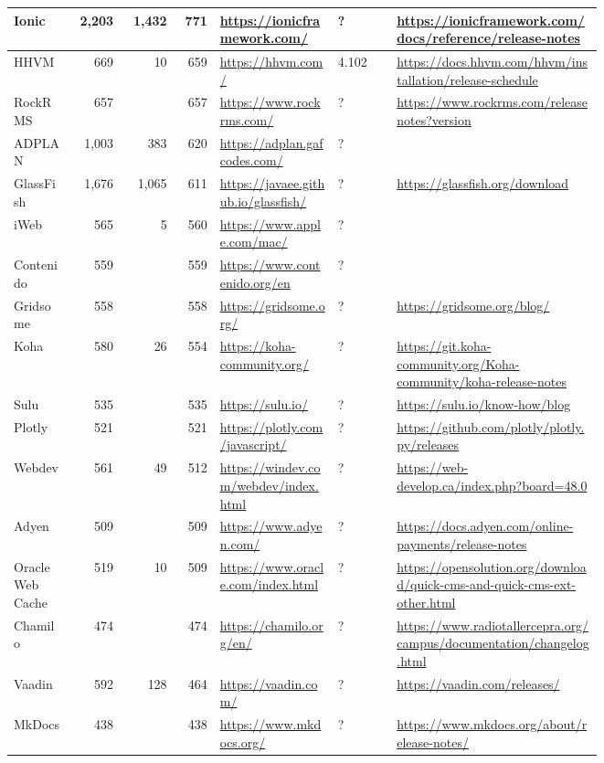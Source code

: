 \begin{landscape}
\begin{longtable}{|p{0.1\linewidth}|r|r|r|p{0.2\linewidth}|p{0.1\linewidth}|p{0.35\linewidth}|}
		Ionic &2,203 &1,432 &771 &\url{https://ionicframework.com/} &? &\url{https://ionicframework.com/docs/reference/release-notes} \\\hline
		HHVM &669 &10 &659 &\url{https://hhvm.com/} &4.102 &\url{https://docs.hhvm.com/hhvm/installation/release-schedule} \\\hline
		RockRMS &657 & &657 &\url{https://www.rockrms.com/} &? &\url{https://www.rockrms.com/releasenotes?version} \\\hline
		ADPLAN &1,003 &383 &620 &\url{https://adplan.gafcodes.com/} &? & \\\hline
		GlassFish &1,676 &1,065 &611 &\url{https://javaee.github.io/glassfish/} &? &\url{https://glassfish.org/download} \\\hline
		iWeb &565 &5 &560 &\url{https://www.apple.com/mac/} &? & \\\hline
		Contenido &559 & &559 &\url{https://www.contenido.org/en} &? & \\\hline
		Gridsome &558 & &558 &\url{https://gridsome.org/} &? &\url{https://gridsome.org/blog/} \\\hline
		Koha &580 &26 &554 &\url{https://koha-community.org/} &? &\url{https://git.koha-community.org/Koha-community/koha-release-notes} \\\hline
		Sulu &535 & &535 &\url{https://sulu.io/} &? &\url{https://sulu.io/know-how/blog} \\\hline
		Plotly &521 & &521 &\url{https://plotly.com/javascript/} &? &\url{https://github.com/plotly/plotly.py/releases} \\\hline
		Webdev &561 &49 &512 &\url{https://windev.com/webdev/index.html} &? &\url{https://web-develop.ca/index.php?board=48.0} \\\hline
		Adyen &509 & &509 &\url{https://www.adyen.com/} &? &\url{https://docs.adyen.com/online-payments/release-notes} \\\hline
		Oracle Web Cache &519 &10 &509 &\url{https://www.oracle.com/index.html} &? &\url{https://opensolution.org/download/quick-cms-and-quick-cms-ext-other.html} \\\hline
		Chamilo &474 & &474 &\url{https://chamilo.org/en/} &? &\url{https://www.radiotallercepra.org/campus/documentation/changelog.html} \\\hline
		Vaadin &592 &128 &464 &\url{https://vaadin.com/} &? &\url{https://vaadin.com/releases/} \\\hline
		MkDocs &438 & &438 &\url{https://www.mkdocs.org/} &? &\url{https://www.mkdocs.org/about/release-notes/} \\\hline

\end{longtable}
\end{landscape}
